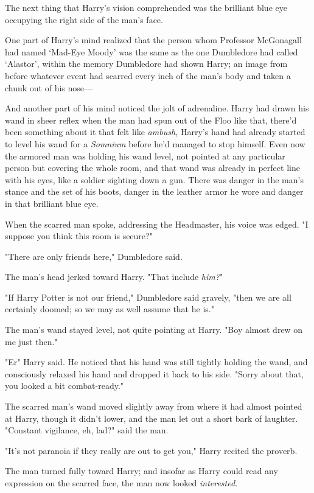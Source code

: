 The next thing that Harry's vision comprehended was the brilliant blue eye
occupying the right side of the man's face.

One part of Harry's mind realized that the person whom Professor McGonagall had
named `Mad-Eye Moody' was the same as the one Dumbledore had called `Alastor',
within the memory Dumbledore had shown Harry; an image from before whatever
event had scarred every inch of the man's body and taken a chunk out of his
nose—

And another part of his mind noticed the jolt of adrenaline. Harry had drawn
his wand in sheer reflex when the man had spun out of the Floo like that,
there'd been something about it that felt like \emph{ambush,} Harry's hand had
already started to level his wand for a \emph{Somnium} before he'd managed to
stop himself. Even now the armored man was holding his wand level, not pointed
at any particular person but covering the whole room, and that wand was already
in perfect line with his eyes, like a soldier sighting down a gun. There was
danger in the man's stance and the set of his boots, danger in the leather
armor he wore and danger in that brilliant blue eye.

When the scarred man spoke, addressing the Headmaster, his voice was edged. "I
suppose you think this room is secure?"

"There are only friends here," Dumbledore said.

The man's head jerked toward Harry. "That include \emph{him?}"

"If Harry Potter is not our friend," Dumbledore said gravely, "then we are all
certainly doomed; so we may as well assume that he is."

The man's wand stayed level, not quite pointing at Harry. "Boy almost drew on
me just then."

"Er{\el}" Harry said. He noticed that his hand was still tightly holding the
wand, and consciously relaxed his hand and dropped it back to his side. "Sorry
about that, you looked a bit{\el} combat-ready."

The scarred man's wand moved slightly away from where it had almost pointed at
Harry, though it didn't lower, and the man let out a short bark of laughter.
"Constant vigilance, eh, lad?" said the man.

"It's not paranoia if they really are out to get you," Harry recited the
proverb.

The man turned fully toward Harry; and insofar as Harry could read any
expression on the scarred face, the man now looked \emph{interested}.

